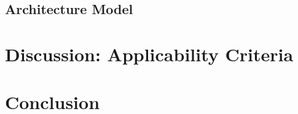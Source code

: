 \subsection{Architecture Model}

\section{Discussion: Applicability Criteria}\label{sec:discussion}

\section{Conclusion}\label{sec:conclussion}
